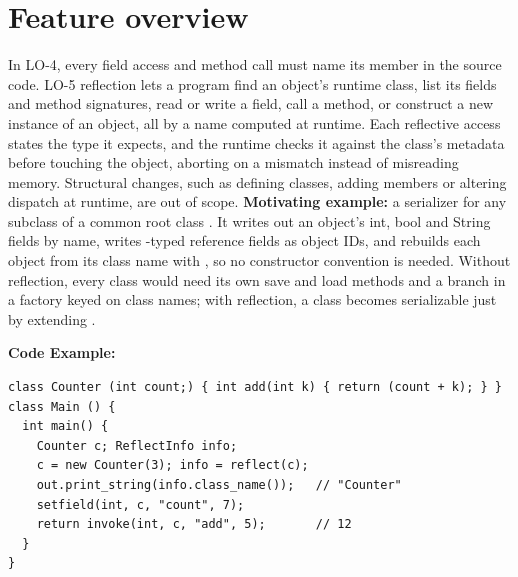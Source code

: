 \section{Feature overview}
In LO-4, every field access and method call must name its member in the source
code. LO-5 reflection lets a program find an object's runtime class, list its
fields and method signatures, read or write a field, call a method, or
construct a new instance of an object, all by a name computed at runtime. Each
reflective access states the type it expects, and the runtime checks it
against the class's metadata before touching the object, aborting on a
mismatch instead of misreading memory. Structural changes, such as defining
classes, adding members or altering dispatch at runtime, are out of scope.
\textbf{Motivating example:} a serializer for any subclass of a common root
class . It writes out an object's int, bool and String fields by
name, writes -typed reference fields as object IDs, and rebuilds
each object from its class name with , so no constructor
convention is needed. Without reflection, every class would need its own save
and load methods and a branch in a factory keyed on class names; with
reflection, a class becomes serializable just by extending .

\textbf{Code Example:}
\begin{lstlisting}
class Counter (int count;) { int add(int k) { return (count + k); } }
class Main () {
  int main() {
    Counter c; ReflectInfo info;
    c = new Counter(3); info = reflect(c);
    out.print_string(info.class_name());   // "Counter"
    setfield(int, c, "count", 7);
    return invoke(int, c, "add", 5);       // 12
  }
}
\end{lstlisting}

